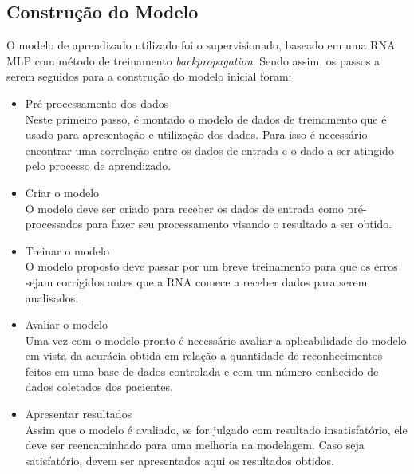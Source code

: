     \subsection{Construção do Modelo}

        O modelo de aprendizado utilizado foi o supervisionado, baseado em uma RNA MLP com método de treinamento \textit{backpropagation}.
        Sendo assim, os passos a serem seguidos para a construção do modelo inicial foram:

        \begin{itemize}
            \item Pré-processamento dos dados \\ Neste primeiro passo, é montado o modelo de dados de treinamento que é usado para apresentação e utilização dos dados. Para isso é necessário encontrar uma correlação entre os dados de entrada e o dado a ser atingido pelo processo de aprendizado.

            \item Criar o modelo \\ O modelo deve ser criado para receber os dados de entrada como pré-processados para fazer seu processamento visando o resultado a ser obtido.

            \item Treinar o modelo \\ O modelo proposto deve passar por um breve treinamento para que os erros sejam corrigidos antes que a RNA comece a receber dados para serem analisados.

            \item Avaliar o modelo \\ Uma vez com o modelo pronto é necessário avaliar a aplicabilidade do modelo em vista da acurácia obtida em relação a quantidade de reconhecimentos feitos em uma base de dados controlada e com um número conhecido de dados coletados dos pacientes.

            \item Apresentar resultados \\ Assim que o modelo é avaliado, se for julgado com resultado insatisfatório, ele deve ser reencaminhado para uma melhoria na modelagem. Caso seja satisfatório, devem ser apresentados aqui os resultados obtidos.
        \end{itemize}
